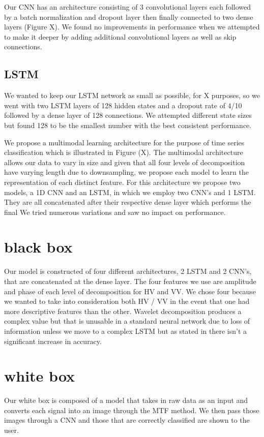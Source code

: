 \documentclass{turabian-thesis}
\begin{document}
Our CNN has an architecture consisting of 3 convolutional layers each followed by a batch normalization and dropout layer then finally connected to two dense layers (Figure X). We found no improvements in performance when we attempted to make it deeper by adding additional convolutional layers as well as skip connections.  



\subsection{LSTM}
We wanted to keep our LSTM network as small as possible, for X purposes, so we went with two LSTM layers of 128 hidden states and a dropout rate of 4/10  followed by a dense layer of 128 connections. We attempted different state sizes but found 128 to be the smallest number with the best consistent performance.



We propose a multimodal learning architecture for the purpose of time series classification which is illustrated in Figure (X). The multimodal architecture allows our data to vary in size and given that all four levels of decomposition have varying length due to downsampling, we propose each model to learn the representation of each distinct feature. For this architecture we propose two models, a 1D CNN and an LSTM, in which we employ two CNN’s and 1 LSTM. They are all concatenated after their respective dense layer which performs the final   We tried numerous variations and saw no impact on performance. 



\section{black box}
Our model is constructed of four different architectures, 2 LSTM and 2 CNN’s, that are concatenated at the dense layer. The four features we use are amplitude and phase of each level of decomposition for HV and VV. We chose four because we wanted to take into consideration both HV / VV in the event that one had more descriptive features than the other. Wavelet decomposition produces a complex value but that is unusable in a standard neural network due to loss of information unless we move to a complex LSTM but as stated in {} there isn’t a significant increase in accuracy. 

\section{white box}
Our white box is composed of a model that takes in raw data as an input and converts each signal into an image through the MTF method. We then pass those images through a CNN and those that are correctly classified are shown to the user.
\end{document}
